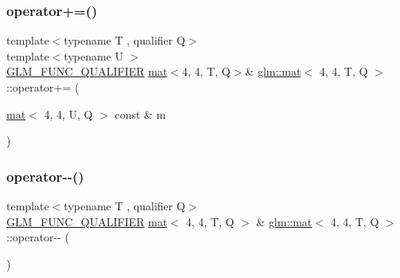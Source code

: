 \subsubsection{\texorpdfstring{operator+=()}{operator+=()}\hspace{0.1cm}{\footnotesize\ttfamily [4/4]}}
{\footnotesize\ttfamily template$<$typename T , qualifier Q$>$ \\
template$<$typename U $>$ \\
\hyperlink{setup_8hpp_a33fdea6f91c5f834105f7415e2a64407}{G\+L\+M\+\_\+\+F\+U\+N\+C\+\_\+\+Q\+U\+A\+L\+I\+F\+I\+ER} \hyperlink{structglm_1_1mat}{mat}$<$4, 4, T, Q$>$\& \hyperlink{structglm_1_1mat}{glm\+::mat}$<$ 4, 4, T, Q $>$\+::operator+= (\begin{DoxyParamCaption}\item[{\hyperlink{structglm_1_1mat}{mat}$<$ 4, 4, U, Q $>$ const \&}]{m }\end{DoxyParamCaption})}

\mbox{\label{structglm_1_1mat_3_014_00_014_00_01_t_00_01_q_01_4_a3c62ee9d03614c428b3e7d81dac27f8c}} 
\subsubsection{\texorpdfstring{operator-\/-\/()}{operator--()}\hspace{0.1cm}{\footnotesize\ttfamily [1/2]}}
{\footnotesize\ttfamily template$<$typename T , qualifier Q$>$ \\
\hyperlink{setup_8hpp_a33fdea6f91c5f834105f7415e2a64407}{G\+L\+M\+\_\+\+F\+U\+N\+C\+\_\+\+Q\+U\+A\+L\+I\+F\+I\+ER} \hyperlink{structglm_1_1mat}{mat}$<$ 4, 4, T, Q $>$ \& \hyperlink{structglm_1_1mat}{glm\+::mat}$<$ 4, 4, T, Q $>$\+::operator-\/-\/ (\begin{DoxyParamCaption}{ }\end{DoxyParamCaption})}

\mbox{\label{structglm_1_1mat_3_014_00_014_00_01_t_00_01_q_01_4_a3f3b1e563c8dcf771cb1ab9767869232}} 
